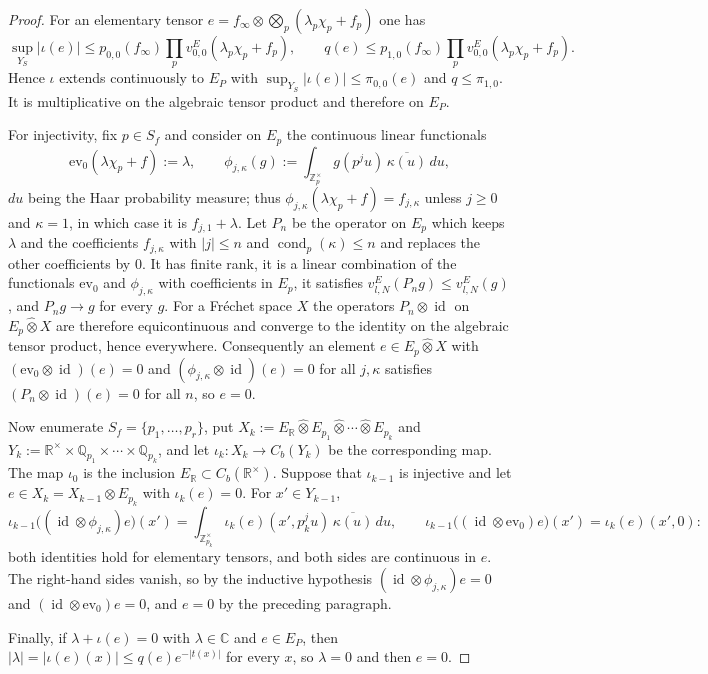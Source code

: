 \documentclass[11pt]{amsart}
\theoremstyle{definition}
\theoremstyle{remark}
\newcommand{\C}{\mathbb C}
\newcommand{\R}{\mathbb R}
\newcommand{\Z}{\mathbb Z}
\newcommand{\Q}{\mathbb Q}
\newcommand{\id}{\operatorname{id}}
\newcommand{\cond}{\operatorname{cond}}
\begin{document}
\begin{proof}
For an elementary tensor $e=f_{\infty}\otimes\bigotimes_p(\lambda_p\chi_p+f_p)$
one has
\[
\sup_{Y_S}|\iota(e)|\le p_{0,0}(f_{\infty})\prod_pv^{E}_{0,0}(\lambda_p\chi_p+f_p),
\qquad
q(e)\le p_{1,0}(f_{\infty})\prod_pv^{E}_{0,0}(\lambda_p\chi_p+f_p).
\]
Hence
$\iota$ extends continuously to $E_P$ with $\sup_{Y_S}|\iota(e)|\le\pi_{0,0}(e)$
and $q\le\pi_{1,0}$.  It is multiplicative on the algebraic tensor product and
therefore on $E_P$.

For injectivity, fix $p\in S_f$ and consider on $E_p$ the continuous linear
functionals
\[
\mathrm{ev}_0(\lambda\chi_p+f):=\lambda,\qquad
\phi_{j,\kappa}(g):=\int_{\Z_p^{\times}}g(p^{j}u)\,\overline{\kappa(u)}\,du ,
\]
$du$ being the Haar probability measure; thus
$\phi_{j,\kappa}(\lambda\chi_p+f)=f_{j,\kappa}$ unless $j\ge0$ and $\kappa=1$,
in which case it is $f_{j,1}+\lambda$.  Let $P_n$ be the operator on $E_p$
which keeps $\lambda$ and the coefficients $f_{j,\kappa}$ with $|j|\le n$ and
$\cond_p(\kappa)\le n$ and replaces the other coefficients by $0$.  It has finite
rank, it is a linear combination of the functionals $\mathrm{ev}_0$ and
$\phi_{j,\kappa}$ with coefficients in $E_p$, it satisfies
$v^{E}_{l,N}(P_ng)\le v^{E}_{l,N}(g)$, and $P_ng\to g$ for every $g$.  For a
Fr\'echet space $X$ the operators $P_n\otimes\id$ on $E_p\widehat\otimes X$ are
therefore equicontinuous and converge to the identity on the algebraic tensor
product, hence everywhere.  Consequently an element $e\in E_p\widehat\otimes X$
with $(\mathrm{ev}_0\otimes\id)(e)=0$ and $(\phi_{j,\kappa}\otimes\id)(e)=0$ for
all $j,\kappa$ satisfies $(P_n\otimes\id)(e)=0$ for all $n$, so $e=0$.

Now enumerate $S_f=\{p_1,\dots,p_r\}$, put
$X_k:=E_{\R}\widehat\otimes E_{p_1}\widehat\otimes\cdots\widehat\otimes E_{p_k}$
and $Y_k:=\R^{\times}\times\Q_{p_1}\times\cdots\times\Q_{p_k}$, and let
$\iota_k:X_k\to C_b(Y_k)$ be the corresponding map.  The map $\iota_0$ is the
inclusion $E_{\R}\subset C_b(\R^{\times})$.  Suppose that $\iota_{k-1}$ is
injective and let $e\in X_k=X_{k-1}\widehat\otimes E_{p_k}$ with
$\iota_k(e)=0$.  For $x'\in Y_{k-1}$,
\[
\iota_{k-1}\bigl((\id\otimes\phi_{j,\kappa})e\bigr)(x')
=\int_{\Z_{p_k}^{\times}}\iota_k(e)(x',p_k^{j}u)\,\overline{\kappa(u)}\,du,
\qquad
\iota_{k-1}\bigl((\id\otimes\mathrm{ev}_0)e\bigr)(x')=\iota_k(e)(x',0):
\]
both identities hold for elementary tensors, and both sides are continuous in
$e$.  The right-hand sides vanish, so by the inductive hypothesis
$(\id\otimes\phi_{j,\kappa})e=0$ and $(\id\otimes\mathrm{ev}_0)e=0$, and $e=0$
by the preceding paragraph.

Finally, if $\lambda+\iota(e)=0$ with $\lambda\in\C$ and $e\in E_P$, then
$|\lambda|=|\iota(e)(x)|\le q(e)e^{-|t(x)|}$ for every $x$, so $\lambda=0$ and
then $e=0$.
\end{proof}
\end{document}

